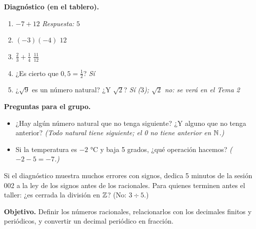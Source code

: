 \documentclass[11pt]{article}
\begin{document}
\textbf{Diagnóstico (en el tablero).}
\begin{enumerate}[label=\alph*)]
  \item $-7 + 12$ \hfill \emph{Respuesta: $5$}
  \item $(-3)(-4)$ \hfill \emph{$12$}
  \item $\frac{2}{3} + \frac{1}{4}$ \hfill \emph{$\frac{11}{12}$}
  \item ¿Es cierto que $0{,}5 = \frac{1}{2}$? \hfill \emph{Sí}
  \item ¿$\sqrt{9}$ es un número natural? ¿Y $\sqrt{2}$? \hfill \emph{Sí ($3$); $\sqrt{2}$ no: se verá en el Tema 2}
\end{enumerate}

\textbf{Preguntas para el grupo.}
\begin{itemize}
  \item ¿Hay algún número natural que no tenga siguiente? ¿Y alguno que no tenga anterior?
        \emph{(Todo natural tiene siguiente; el 0 no tiene anterior en $\mathbb{N}$.)}
  \item Si la temperatura es $-2$ °C y baja 5 grados, ¿qué operación hacemos?
        \emph{($-2 - 5 = -7$.)}
\end{itemize}

\begin{nota}
Si el diagnóstico muestra muchos errores con signos, dedica 5 minutos de la sesión 002 a la
ley de los signos antes de los racionales. Para quienes terminen antes el taller: ¿es cerrada
la división en $\mathbb{Z}$? (No: $3 \div 5$.)
\end{nota}


\textbf{Objetivo.} Definir los números racionales, relacionarlos con los decimales finitos y
periódicos, y convertir un decimal periódico en fracción.
\end{document}

